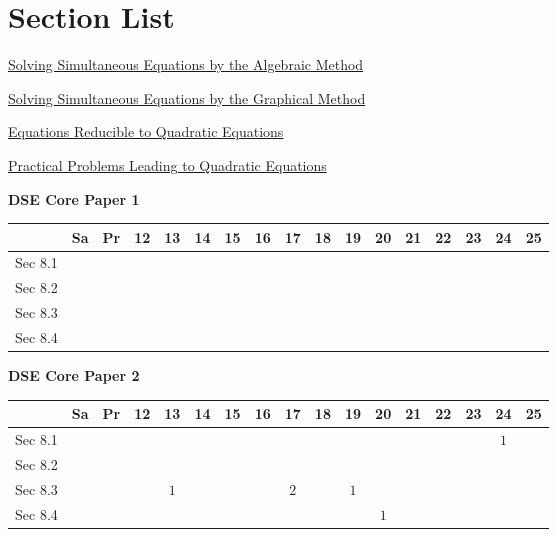 \documentclass[12pt, a4paper]{article}
\begin{document}
\section*{Section List}
\begin{enumx}[label=Sec 8.\arabic*\ ]
\item \hyperref[section:4-8-1]{Solving Simultaneous Equations by the Algebraic Method  \NF}
\item \hyperref[section:4-8-2]{Solving Simultaneous Equations by the Graphical Method \NF}
\item \hyperref[section:4-8-3]{Equations Reducible to Quadratic Equations \NF}
\item \hyperref[section:4-8-4]{Practical Problems Leading to Quadratic Equations \NF}
\end{enumx}
\begin{absolutelynopagebreak}
\begin{center}
\textbf{DSE Core Paper 1}
\end{center}
\begin{center}
\begin{tabular}{|l|c|c|c|c|c|c|c|c|c|c|c|c|c|c|c|c|}
\hline
        & Sa & Pr & 12 & 13 & 14 & 15 & 16 & 17 & 18 & 19 & 20 & 21 & 22 & 23 & 24 & 25 \\\hline\hline
Sec 8.1 &  &  &  &  &  &  &  &  &  &  &  &  &  &  &  &  \\\hline
Sec 8.2 &  &  &  &  &  &  &  &  &  &  &  &  &  &  &  &  \\\hline
Sec 8.3 &  &  &  &  &  &  &  &  &  &  &  &  &  &  &  &  \\\hline
Sec 8.4 &  &  &  &  &  &  &  &  &  &  &  &  &  &  &  &  \\\hline
\end{tabular}
\end{center}
\end{absolutelynopagebreak}
\begin{absolutelynopagebreak}
\begin{center}
\textbf{DSE Core Paper 2}
\end{center}
\begin{center}
\begin{tabular}{|l|c|c|c|c|c|c|c|c|c|c|c|c|c|c|c|c|}
\hline
        & Sa & Pr & 12 & 13 & 14 & 15 & 16 & 17 & 18 & 19 & 20 & 21 & 22 & 23 & 24 & 25 \\\hline\hline
Sec 8.1 &  &  &  &  &  &  &  &  &  &  &  &  &  &  &  $1$ &  \\\hline
Sec 8.2 &  &  &  &  &  &  &  &  &  &  &  &  &  &  &  &  \\\hline
Sec 8.3 &  &  &  &  $1$ &  &  &  &  $2$ &  &  $1$ &  &  &  &  &  &  \\\hline
Sec 8.4 &  &  &  &  &  &  &  &  &  &  &  $1$ &  &  &  &  &  \\\hline
\end{tabular}
\end{center}
\end{absolutelynopagebreak}
\end{document}
